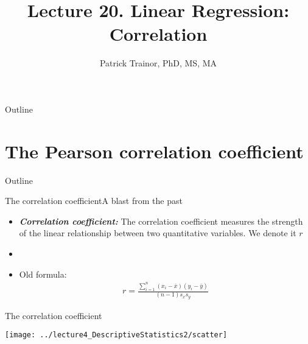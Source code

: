 \documentclass[xcolor=dvipsnames]{beamer}
\title[Lecture 20]{Lecture 20. Linear Regression: Correlation}
\author[Patrick Trainor]{Patrick Trainor, PhD, MS, MA}
\institute[NMSU]{New Mexico State University}
\date{}
\begin{document}
\begin{frame}
\maketitle
\end{frame}

\begin{frame}{Outline}
\tableofcontents[hideallsubsections]
\end{frame}

\section{The Pearson correlation coefficient}
\begin{frame}{Outline}
	\tableofcontents[currentsection,subsectionstyle=show/shaded/hide]
\end{frame}

\begin{frame}{The correlation coefficient}{A blast from the past}
	\begin{itemize}
		\item \textbf{\emph{Correlation coefficient:}} The correlation coefficient measures the strength of the linear relationship between two quantitative variables. We denote it $r$ \pause
		\item[]
		\item Old formula: \pause
		\begin{gather*}
		r = \frac{\sum_{i=1}^n(x_i -\bar{x})(y_i - \bar{y})}{(n-1) s_x s_y}
		\end{gather*}
	\end{itemize}
\end{frame}

\begin{frame}{The correlation coefficient}
	\begin{center}
		\texttt{[image: ../lecture4\_DescriptiveStatistics2/scatter]}
	\end{center}
\end{frame}
\end{document}
